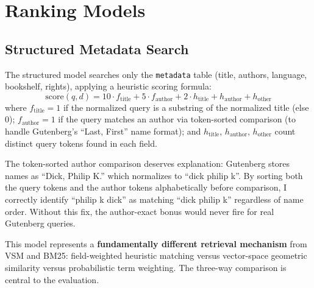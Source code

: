 \documentclass[sigconf,nonacm]{acmart}
\begin{document}
\section{Ranking Models}

\subsection{Structured Metadata Search}
The structured model searches only the \texttt{metadata} table (title, authors,
language, bookshelf, rights), applying a heuristic scoring formula:
\begin{equation}
  \text{score}(q, d) = 10 \cdot f_{\text{title}} + 5 \cdot f_{\text{author}}
                      + 2 \cdot h_{\text{title}} + h_{\text{author}} + h_{\text{other}}
\end{equation}
where $f_{\text{title}} = 1$ if the normalized query is a substring of the
normalized title (else 0); $f_{\text{author}} = 1$ if the query matches an
author via token-sorted comparison (to handle Gutenberg's ``Last, First''
name format); and $h_{\text{title}}$, $h_{\text{author}}$, $h_{\text{other}}$
count distinct query tokens found in each field.

The token-sorted author comparison deserves explanation: Gutenberg stores names
as ``Dick, Philip K.'' which normalizes to ``dick philip k''.  By sorting both
the query tokens and the author tokens alphabetically before comparison, I
correctly identify ``philip k dick'' as matching ``dick philip k'' regardless of
name order.  Without this fix, the author-exact bonus would never fire for
real Gutenberg queries.

This model represents a \textbf{fundamentally different retrieval mechanism}
from VSM and BM25: field-weighted heuristic matching versus vector-space
geometric similarity versus probabilistic term weighting.  The three-way
comparison is central to the evaluation.
\end{document}
